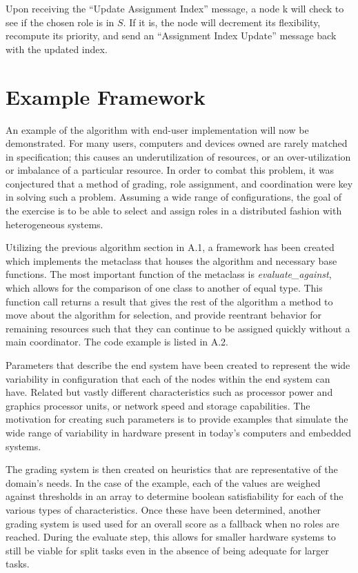 \documentclass[11pt]{article}
\begin{document}
\begin{multicols}{2}
Upon receiving the ``Update Assignment Index'' message, a node k will check to see if the chosen role is in $S$. If it is, the node will decrement its flexibility, recompute its priority, and send an ``Assignment Index Update'' message back with the updated index.

\section{Example Framework}
An example of the algorithm with end-user implementation will now be demonstrated.  For many users, computers and devices owned are rarely matched in specification; this causes an underutilization of resources, or an over-utilization or imbalance of a particular resource.  In order to combat this problem, it was conjectured that a method of grading, role assignment, and coordination were key in solving such a problem.  Assuming a wide range of configurations, the goal of the exercise is to be able to select and assign roles in a distributed fashion with heterogeneous systems.

Utilizing the previous algorithm section in A.1, a framework has been created which implements the metaclass that houses the algorithm and necessary base functions.  The most important function of the metaclass is \textit{evaluate\_against}, which allows for the comparison of one class to another of equal type.  This function call returns a result that gives the rest of the algorithm a method to move about the algorithm for selection, and provide reentrant behavior for remaining resources such that they can continue to be assigned quickly without a main coordinator.  The code example is listed in A.2.

Parameters that describe the end system have been created to represent the wide variability in configuration that each of the nodes within the end system can have.  Related but vastly different characteristics such as processor power and graphics processor units, or network speed and storage capabilities.  The motivation for creating such parameters is to provide examples that simulate the wide range of variability in hardware present in today's computers and embedded systems.

The grading system is then created on heuristics that are representative of the domain's needs.  In the case of the example, each of the values are weighed against thresholds in an array to determine boolean satisfiability for each of the various types of characteristics.  Once these have been determined, another grading system is used used for an overall score as a fallback when no roles are reached.  During the evaluate step, this allows for smaller hardware systems to still be viable for split tasks even in the absence of being adequate for larger tasks.


\end{multicols}
\end{document}
